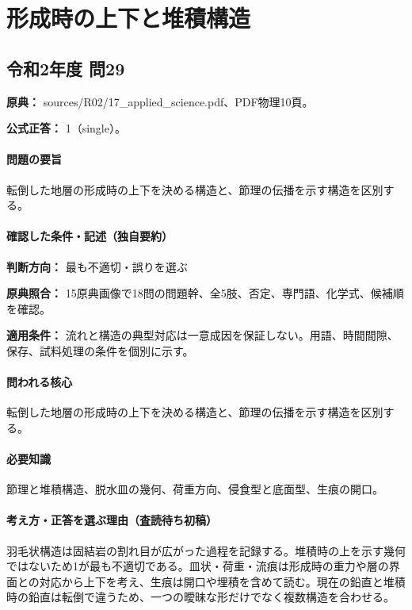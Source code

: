 \section{形成時の上下と堆積構造}

\subsection{令和2年度 問29}
\label{q:r02-reg-applied-29}

\noindent\textbf{原典：} sources/R02/17\_applied\_science.pdf、PDF物理10頁。

\textbf{公式正答：} 1（single）。

\paragraph{問題の要旨} 転倒した地層の形成時の上下を決める構造と、節理の伝播を示す構造を区別する。

\paragraph{確認した条件・記述（独自要約）}\mbox{}\par

\noindent\textbf{判断方向：} 最も不適切・誤りを選ぶ\par

\noindent\textbf{原典照合：} 15原典画像で18問の問題幹、全5肢、否定、専門語、化学式、候補順を確認。\par

\noindent\textbf{適用条件：} 流れと構造の典型対応は一意成因を保証しない。用語、時間間隙、保存、試料処理の条件を個別に示す。\par

\paragraph{問われる核心} 転倒した地層の形成時の上下を決める構造と、節理の伝播を示す構造を区別する。

\paragraph{必要知識} 節理と堆積構造、脱水皿の幾何、荷重方向、侵食型と底面型、生痕の開口。

\paragraph{考え方・正答を選ぶ理由（査読待ち初稿）} 羽毛状構造は固結岩の割れ目が広がった過程を記録する。堆積時の上を示す幾何ではないため1が最も不適切である。皿状・荷重・流痕は形成時の重力や層の界面との対応から上下を考え、生痕は開口や埋積を含めて読む。現在の鉛直と堆積時の鉛直は転倒で違うため、一つの曖昧な形だけでなく複数構造を合わせる。


